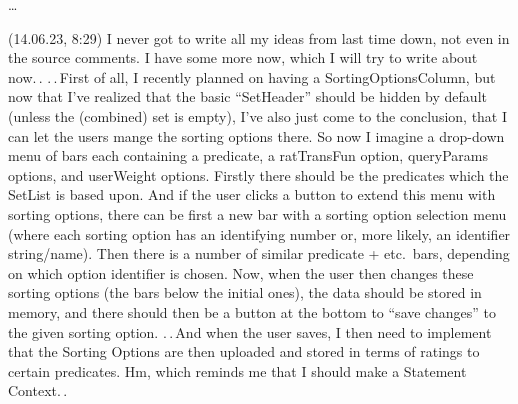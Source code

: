 \documentclass{report}
\begin{document}

\ldots

(14.06.23, 8:29) I never got to write all my ideas from last time down, not even in the source comments. I have some more now, which I will try to write about now.\,. .\,.\,First of all, I recently planned on having a SortingOptionsColumn, but now that I've realized that the basic ``SetHeader'' should be hidden by default (unless the (combined) set is empty), I've also just come to the conclusion, that I can let the users mange the sorting options there. So now I imagine a drop-down menu of bars each containing a predicate, a ratTransFun option, queryParams options, and userWeight options. Firstly there should be the predicates which the SetList is based upon. And if the user clicks a button to extend this menu with sorting options, there can be first a new bar with a sorting option selection menu (where each sorting option has an identifying number or, more likely, an identifier string/name). Then there is a number of similar predicate + etc.\ bars, depending on which option identifier is chosen. Now, when the user then changes these sorting options (the bars below the initial ones), the data should  be stored in memory, and there should then be a button at the bottom to ``save changes'' to the given sorting option. %
.\,.\,And when the user saves, I then need to implement that the Sorting Options are then uploaded and stored in terms of ratings to certain predicates. Hm, which reminds me that I should make a Statement Context.\,.
\end{document}
